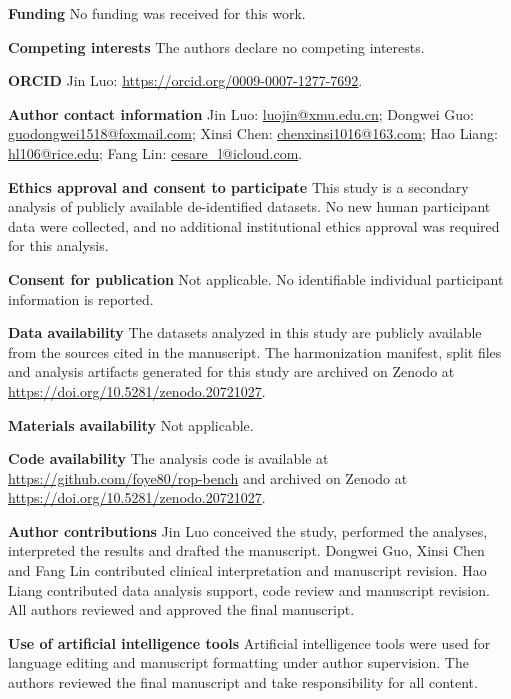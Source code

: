 \documentclass[pdflatex,sn-vancouver,Numbered,iicol]{sn-jnl}
\begin{document}
\textbf{Funding} No funding was received for this work.

\textbf{Competing interests} The authors declare no competing interests.

\textbf{ORCID} Jin Luo: \url{https://orcid.org/0009-0007-1277-7692}.

\textbf{Author contact information} Jin Luo: \url{luojin@xmu.edu.cn}; Dongwei
Guo: \url{guodongwei1518@foxmail.com}; Xinsi Chen:
\url{chenxinsi1016@163.com}; Hao Liang: \url{hl106@rice.edu}; Fang Lin:
\url{cesare_l@icloud.com}.

\textbf{Ethics approval and consent to participate} This study is a secondary
analysis of publicly available de-identified datasets. No new human participant
data were collected, and no additional institutional ethics approval was required
for this analysis.

\textbf{Consent for publication} Not applicable. No identifiable individual
participant information is reported.

\textbf{Data availability} The datasets analyzed in this study are publicly
available from the sources cited in the manuscript. The harmonization manifest,
split files and analysis artifacts generated for this study are archived on
Zenodo at \url{https://doi.org/10.5281/zenodo.20721027}.

\textbf{Materials availability} Not applicable.

\textbf{Code availability} The analysis code is available at
\url{https://github.com/foye80/rop-bench} and archived on Zenodo at
\url{https://doi.org/10.5281/zenodo.20721027}.

\textbf{Author contributions} Jin Luo conceived the study, performed the
analyses, interpreted the results and drafted the manuscript. Dongwei Guo, Xinsi
Chen and Fang Lin contributed clinical interpretation and manuscript revision.
Hao Liang contributed data analysis support, code review and manuscript revision.
All authors reviewed and approved the final manuscript.

\textbf{Use of artificial intelligence tools} Artificial intelligence tools were
used for language editing and manuscript formatting under author supervision. The
authors reviewed the final manuscript and take responsibility for all content.
\end{document}
